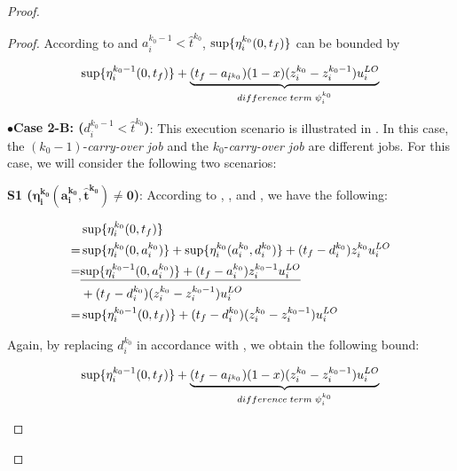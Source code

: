 \documentclass[10pt,journal,compsoc]{IEEEtran}
\begin{document}
\begin{proof}
\begin{proof}
According to  and $a_i^{k_0-1}<\hat{t}^{k_0}$, $\sup\{\eta_i^{k_0}(0,t_f)\}$ can be bounded by
\begin{small}
\begin{align}
\sup\{\eta_i^{k_0-1}(0,t_f)\}+\underbrace{(t_f-a_{\hat{t}^{k_0}})(1-x)(z_i^{k_0}-z_i^{k_0-1})u_i^{LO}}_{difference\;term\;\psi_i^{k_0}}
\label{eq:lema_diff1_4}
\end{align}
\end{small} 

\noindent$\bullet$\textbf{Case 2-B: (${d_i^{k_0-1}}<\hat{t}^{k_0}$)}: This execution scenario is illustrated in . In this case, the $(k_0-1)$-\textit{carry-over job} and the $k_0$-\textit{carry-over job} are different jobs. For this case, we will consider the following two scenarios:

\noindent\textbf{S1 ($\mathbf{\eta_i^{k_0}(a_i^{k_0},\hat{t}^{k_0})\neq{0}}$)}: 
According to  ,  , and , we have the following: 
\begin{footnotesize}
\begin{align*}
	&\sup\{\eta_i^{k_0}(0,t_f)\} \nonumber \\
=&\sup\{\eta_i^{k_0}(0,a_i^{k_0})\}+\sup\{\eta_i^{k_0}(a_i^{k_0},d_i^{k_0})\}+(t_f-d_i^{k_0})z_i^{k_0}u_i^{LO} \nonumber  \\
=&\underline{\sup\{\eta_i^{k_0-1}(0,a_i^{k_0})\}+(t_f-a_i^{k_0}){z_i^{k_0-1}}{u_i^{LO}}} \nonumber \\
&+(t_f-d_i^{k_0}){(z_i^{k_0}-z_i^{k_0-1})}{u_i^{LO}} \nonumber \\
=&\sup\{\eta_i^{k_0-1}(0,t_f)\}+(t_f-d_i^{k_0}){(z_i^{k_0}-z_i^{k_0-1})}{u_i^{LO}}
\end{align*}
\end{footnotesize}

Again, by replacing $d_i^{k_0}$ in accordance with , we obtain the following bound:
\begin{small}
\begin{align}
\sup\{\eta_i^{k_0-1}(0,t_f)\}+\underbrace{(t_f-a_{\hat{t}^{k_0}})(1-x)(z_i^{k_0}-z_i^{k_0-1}){u_i^{LO}}}_{difference\;term\;\psi_i^{k_0}}
\label{eq:lema_diff1_5}
\end{align}
\end{small}


\end{proof}
\end{proof}
\end{document}
